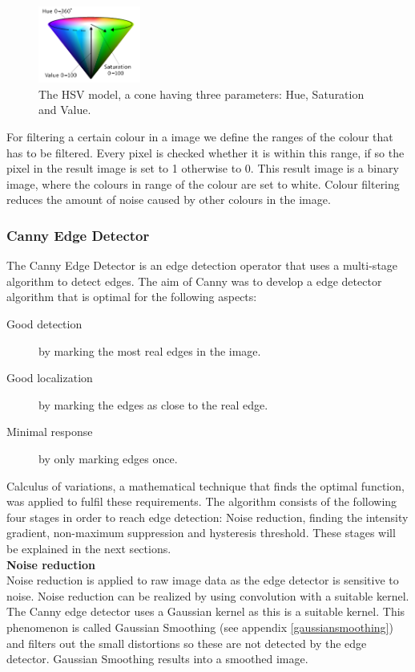 \documentclass[a4paper]{article}
\begin{document}
\begin{figure}[!ht]
\centering
\includegraphics[width=0.3\textwidth]{images/hsv.png}
\caption{The HSV model, a cone having three parameters: Hue, Saturation and Value.}
\label{hsv}
\end{figure}

For filtering a certain colour in a image we define the ranges of the colour that has to be filtered. Every pixel is checked whether it is within this range, if so the pixel in the result image is set to 1 otherwise to 0. This result image is a binary image, where the colours in range of the colour are set to white. Colour filtering reduces the amount of noise caused by other colours in the image.

\subsubsection{Canny Edge Detector}
The Canny Edge Detector \cite{Canny1986} is an edge detection operator that uses a multi-stage algorithm to detect edges. The aim of Canny was to develop a edge detector algorithm that is optimal for the following aspects:
\begin{description}
\item[Good detection] by marking the most real edges in the image.
\item[Good localization] by marking the edges as close to the real edge.
\item[Minimal response] by only marking edges once.
\end{description}
Calculus of variations, a mathematical technique that finds the optimal function, was applied to fulfil these requirements. The algorithm consists of the following four stages in order to reach edge detection: Noise reduction, finding the intensity gradient, non-maximum suppression and hysteresis threshold. These stages will be explained in the next sections.\\

\noindent\textbf{Noise reduction}\\
Noise reduction is applied to raw image data as the edge detector is sensitive to noise. Noise reduction can be realized by using convolution with a suitable kernel. The Canny edge detector uses a Gaussian kernel as this is a suitable kernel. This phenomenon is called Gaussian Smoothing (see appendix \ref{gaussiansmoothing}) and filters out the small distortions so these are not detected by the edge detector. Gaussian Smoothing results into a smoothed image.\\
\end{document}
